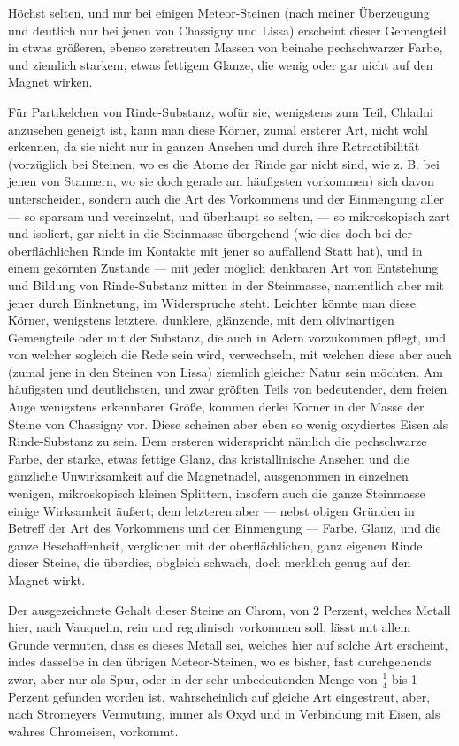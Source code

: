\documentclass[a4paper, 11pt, oneside, german]{article}
\begin{document}
Höchst selten, und nur bei einigen Meteor-Steinen (nach meiner Überzeugung und deutlich nur bei jenen von Chassigny und Lissa) erscheint dieser Gemengteil in etwas größeren, ebenso zerstreuten Massen von beinahe pechschwarzer Farbe, und ziemlich starkem, etwas fettigem Glanze, die wenig oder gar nicht auf den Magnet wirken.

Für Partikelchen von Rinde-Substanz, wofür sie, wenigstens zum Teil, Chladni anzusehen geneigt ist, kann man diese Körner, zumal ersterer Art, nicht wohl erkennen, da sie nicht nur in ganzen Ansehen und durch ihre Retractibilität (vorzüglich bei Steinen, wo es die Atome der Rinde gar nicht sind, wie z. B. bei jenen von Stannern, wo sie doch gerade am häufigsten vorkommen) sich davon unterscheiden, sondern auch die Art des Vorkommens und der Einmengung aller --- so sparsam und vereinzelnt, und überhaupt so selten, --- so mikroskopisch zart und isoliert, gar nicht in die Steinmasse übergehend (wie dies doch bei der oberflächlichen Rinde im Kontakte mit jener so auffallend Statt hat), und in einem gekörnten Zustande --- mit jeder möglich denkbaren Art von Entstehung und Bildung von Rinde-Substanz mitten in der Steinmasse, namentlich aber mit jener durch Einknetung, im Widerspruche steht. Leichter könnte man diese Körner, wenigstens letztere, dunklere, glänzende, mit dem olivinartigen Gemengteile oder mit der Substanz, die auch in Adern vorzukommen pflegt, und von welcher sogleich die Rede sein wird, verwechseln, mit welchen diese aber auch (zumal jene in den Steinen von Lissa) ziemlich gleicher Natur sein möchten. Am häufigsten und deutlichsten, und zwar größten Teils von bedeutender, dem freien Auge wenigstens erkennbarer Größe, kommen derlei Körner in der Masse der Steine von Chassigny vor. Diese scheinen aber eben so wenig oxydiertes Eisen als Rinde-Substanz zu sein. Dem ersteren widerspricht nämlich die pechschwarze Farbe, der starke, etwas fettige Glanz, das kristallinische Ansehen und die gänzliche Unwirksamkeit auf die Magnetnadel, ausgenommen in einzelnen wenigen, mikroskopisch kleinen Splittern, insofern auch die ganze Steinmasse einige Wirksamkeit äußert; dem letzteren aber --- nebst obigen Gründen in Betreff der Art des Vorkommens und der Einmengung --- Farbe, Glanz, und die ganze Beschaffenheit, verglichen mit der oberflächlichen, ganz eigenen Rinde dieser Steine, die überdies, obgleich schwach, doch merklich genug auf den Magnet wirkt.

Der ausgezeichnete Gehalt dieser Steine an Chrom, von 2 Perzent, welches Metall hier, nach Vauquelin, rein und regulinisch vorkommen soll, lässt mit allem Grunde vermuten, dass es dieses Metall sei, welches hier auf solche Art erscheint, indes dasselbe in den übrigen Meteor-Steinen, wo es bisher, fast durchgehends zwar, aber nur als Spur, oder in der sehr unbedeutenden Menge von $\frac{1}{4}$ bis 1 Perzent gefunden worden ist, wahrscheinlich auf gleiche Art eingestreut, aber, nach Stromeyers Vermutung, immer als Oxyd und in Verbindung mit Eisen, als wahres Chromeisen, vorkommt.
\end{document}
